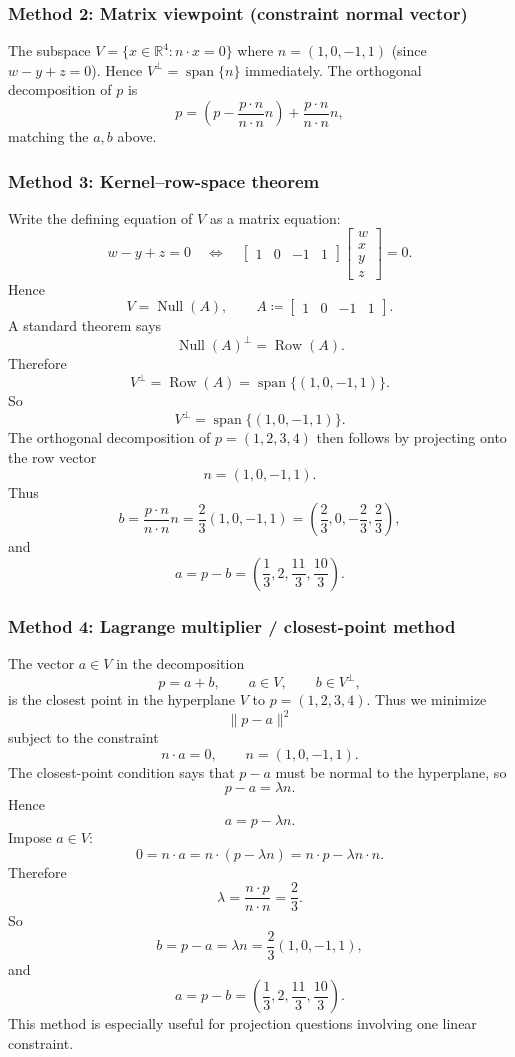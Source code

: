 \documentclass[12pt]{article}
\newcommand{\df}{\coloneqq}
\newcommand{\R}{\mathbb{R}}
\DeclareMathOperator{\Span}{span}
\DeclareMathOperator{\Null}{Null}
\DeclareMathOperator{\Row}{Row}
\begin{document}
\subsubsection{Method 2: Matrix viewpoint (constraint normal vector)}
The subspace $V=\{x\in\R^4: n\cdot x=0\}$ where $n=(1,0,-1,1)$ (since $w-y+z=0$).
Hence $V^\perp=\Span\{n\}$ immediately. The orthogonal decomposition of $p$ is
\[
p=\left(p-\frac{p\cdot n}{n\cdot n}n\right)+\frac{p\cdot n}{n\cdot n}n,
\]
matching the $a,b$ above.



\subsubsection{Method 3: Kernel--row-space theorem}
Write the defining equation of $V$ as a matrix equation:
\[
w-y+z=0
\quad\Longleftrightarrow\quad
\begin{bmatrix}1&0&-1&1\end{bmatrix}
\begin{bmatrix}w\\x\\y\\z\end{bmatrix}=0.
\]
Hence
\[
V=\Null(A),
\qquad
A\df\begin{bmatrix}1&0&-1&1\end{bmatrix}.
\]
A standard theorem says
\[
\Null(A)^{\perp}=\Row(A).
\]
Therefore
\[
V^{\perp}=\Row(A)=\Span\{(1,0,-1,1)\}.
\]
So
\[
\boxed{\,V^{\perp}=\Span\{(1,0,-1,1)\}.\,}
\]
The orthogonal decomposition of $p=(1,2,3,4)$ then follows by projecting onto the row vector
\[
n=(1,0,-1,1).
\]
Thus
\[
b=\frac{p\cdot n}{n\cdot n}n
=\frac{2}{3}(1,0,-1,1)
=\left(\frac23,0,-\frac23,\frac23\right),
\]
and
\[
a=p-b=\left(\frac13,2,\frac{11}{3},\frac{10}{3}\right).
\]

\subsubsection{Method 4: Lagrange multiplier / closest-point method}
The vector $a\in V$ in the decomposition
\[
p=a+b,
\qquad a\in V,
\qquad b\in V^{\perp},
\]
is the closest point in the hyperplane $V$ to $p=(1,2,3,4)$.
Thus we minimize
\[
\|p-a\|^2
\]
subject to the constraint
\[
n\cdot a=0,
\qquad n=(1,0,-1,1).
\]
The closest-point condition says that $p-a$ must be normal to the hyperplane, so
\[
p-a=\lambda n.
\]
Hence
\[
a=p-\lambda n.
\]
Impose $a\in V$:
\[
0=n\cdot a=n\cdot(p-\lambda n)=n\cdot p-\lambda n\cdot n.
\]
Therefore
\[
\lambda=\frac{n\cdot p}{n\cdot n}=\frac{2}{3}.
\]
So
\[
b=p-a=\lambda n=\frac23(1,0,-1,1),
\]
and
\[
a=p-b=\left(\frac13,2,\frac{11}{3},\frac{10}{3}\right).
\]
This method is especially useful for projection questions involving one linear constraint.
\end{document}
